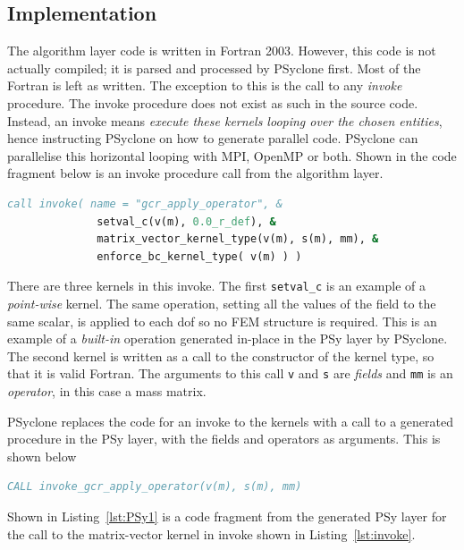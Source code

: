 \documentclass[review,times]{elsarticle}
\begin{document}
\subsection{\label{sec:sub:implement}Implementation}

The algorithm layer code is written in Fortran 2003. However, this
code is not actually compiled; it is parsed and processed by PSyclone
first. Most of the Fortran is left as written. The exception to this
is the call to any {\em invoke} procedure. The invoke procedure does not 
exist as such in the source code. Instead, an invoke means {\em execute these
kernels looping over the chosen entities}, hence instructing PSyclone on how to 
generate parallel code. PSyclone can parallelise this horizontal looping with MPI,
OpenMP or both. Shown in the code fragment below is an invoke
procedure call from the algorithm layer.

\begin{lstlisting}[language=Fortran,caption={Code fragment showing an
invoke procedure from the Algorithm layer},label={lst:invoke}]
 call invoke( name = "gcr_apply_operator", &
              setval_c(v(m), 0.0_r_def), &
              matrix_vector_kernel_type(v(m), s(m), mm), &
              enforce_bc_kernel_type( v(m) ) )
\end{lstlisting}

There are three kernels in this invoke. The first \verb+setval_c+ is
an example of a {\em point-wise} kernel. The same operation, setting all
the values of the field to the same scalar, is applied to each dof so no 
FEM structure is required. This is an example of a {\em built-in} operation 
generated in-place in the PSy layer by PSyclone. The second
kernel is written as a call to the constructor of the kernel type, so that it is
valid Fortran. The arguments to this call \verb+v+ and \verb+s+ are
{\em fields} and \verb+mm+ is an {\em operator}, in this case a mass
matrix.

PSyclone replaces the code for an invoke to the kernels with a call to a
generated procedure in the PSy layer, with the fields and operators as
arguments. This is shown below
\begin{lstlisting}[language=Fortran,caption={Code fragment showing the
generated Algorithm layer code},label={lst:invoke_56}]
 CALL invoke_gcr_apply_operator(v(m), s(m), mm)
\end{lstlisting}

Shown in Listing~\ref{lst:PSy1} is a code fragment from the generated PSy layer for
the call to the matrix-vector kernel in invoke shown in Listing~\ref{lst:invoke}.
\end{document}
